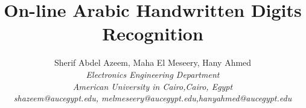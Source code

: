 \documentclass[times, 10pt,twocolumn]{article}
\begin{document}
%
\title{On-line Arabic Handwritten Digits Recognition}

% 
% 



\author{Sherif Abdel Azeem, Maha El Meseery, Hany Ahmed \\
\emph{Electronics Engineering Department} \\ \emph{American University in
Cairo,Cairo, Egypt}\\
\emph{shazeem@aucegypt.edu, melmeseery@aucegypt.edu,hanyahmed@aucegypt.edu}\\
}

% 


\maketitle
\end{document}
